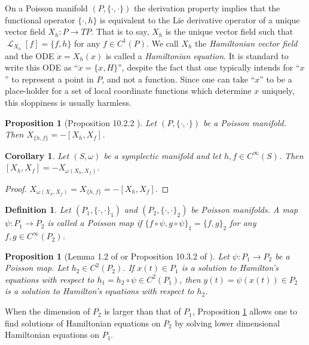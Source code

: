 \documentclass[12pt]{amsart}
\newtheorem{prop}[thm]{Proposition}
\newtheorem{cor}[thm]{Corollary}
\newtheorem{defn}[thm]{Definition}
\DeclareMathOperator{\lie}{\mathcal{L}}
\begin{document}
On a Poisson manifold $(P,\{ \cdot , \cdot \})$
the derivation property implies that the functional operator
$\{ \cdot , h \}$ is equivalent
to the Lie derivative operator of a unique vector field $X_h:P \to TP$.
That is to say, $X_h$ is the unique vector field such that $\lie_{X_h}[f] = \{ f , h \}$ for any $f \in C^1(P)$.
We call $X_h$ the \emph{Hamiltonian vector field} and the ODE $\dot{x} = X_h(x)$ is called a \emph{Hamiltonian equation}.
It is standard to write this ODE as ``$\dot{x} = \{ x , H\}$'',
despite the fact that one typically intends for ``$x$'' to represent
a point in $P$, and not a function.
Since one can take ``$x$'' to be a place-holder for a set of
local coordinate functions which determine $x$ uniquely, this
sloppiness is usually harmless.

\begin{prop}[Proposition 10.2.2 \cite{MandS}] \label{prop:Lie_hom}
  Let $(P,\{ \cdot , \cdot \})$ be a Poisson manifold.
  Then $X_{ \{ h ,f \} } = - [X_h , X_f ]$.
\end{prop}

\begin{cor} \label{cor:Lie_hom}
  Let $(S,\omega)$ be a symplectic manifold
  and let $h,f \in C^{\infty}(S)$.
  Then $[X_h , X_f] = -X_{\omega(X_h,X_f) }$.
\end{cor}
\begin{proof}
  $X_{\omega(X_h,X_f)} = X_{ \{h,f\} } = -[X_h , X_f]$.
\end{proof}

\begin{defn}
  Let $(P_1, \{ \cdot , \cdot \}_1)$ and $(P_2, \{ \cdot , \cdot \}_2)$
  be Poisson manifolds.
  A map $\psi:P_1 \to P_2$ is called a
  \emph{Poisson map} if $\{ f \circ \psi , g \circ \psi \}_1 = \{ f , g \}_2$  for any $f,g \in C^{\infty}(P_2)$.
\end{defn}


\begin{prop}[Lemma 1.2 of \cite{Weinstein1983} or Proposition 10.3.2 of \cite{MandS}] \label{prop:Poisson_dynamics}
  Let $\psi:P_1 \to P_2$ be a Poisson map.
  Let $h_2 \in C^2(P_2)$.
  If $x(t) \in P_1$ is a solution to Hamilton's equations with respect
  to $h_1 = h_2 \circ \psi \in C^2(P_1)$, then $y(t) = \psi(x(t)) \in P_2$ is a solution
  to Hamilton's equations with respect to $h_2$.
\end{prop}

  When the dimension of $P_2$ is larger than that of $P_1$,
  Proposition \ref{prop:Poisson_dynamics} allows one to find solutions of
  Hamiltonian equations on $P_2$
  by solving lower dimensional Hamiltonian equations
  on $P_1$.
\end{document}
